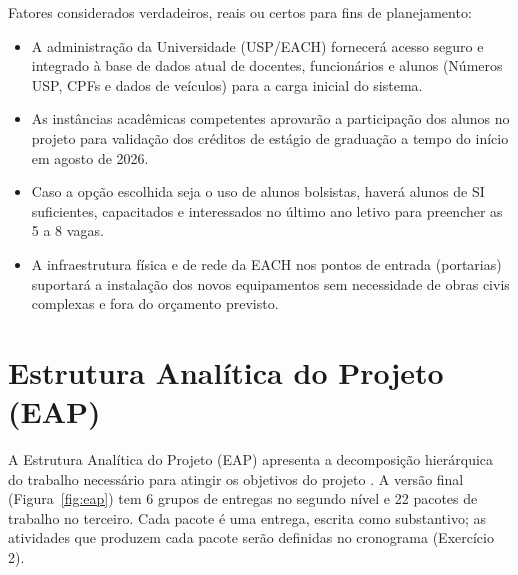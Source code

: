 \documentclass[a4paper]{article}
\begin{document}
Fatores considerados verdadeiros, reais ou certos para fins de planejamento:

\begin{itemize}
    \item A administração da Universidade (USP/EACH) fornecerá acesso seguro e integrado à base de dados atual de docentes, funcionários e alunos (Números USP, CPFs e dados de veículos) para a carga inicial do sistema.
    \item As instâncias acadêmicas competentes aprovarão a participação dos alunos no projeto para validação dos créditos de estágio de graduação a tempo do início em agosto de 2026.
    \item Caso a opção escolhida seja o uso de alunos bolsistas, haverá alunos de SI suficientes, capacitados e interessados no último ano letivo para preencher as 5 a 8 vagas.
    \item A infraestrutura física e de rede da EACH nos pontos de entrada (portarias) suportará a instalação dos novos equipamentos sem necessidade de obras civis complexas e fora do orçamento previsto.
\end{itemize}

\section{Estrutura Analítica do Projeto (EAP)}

A Estrutura Analítica do Projeto (EAP) apresenta a decomposição hierárquica do trabalho necessário para atingir os objetivos do projeto \cite{pmi2017}. A versão final (Figura~\ref{fig:eap}) tem 6 grupos de entregas no segundo nível e 22 pacotes de trabalho no terceiro. Cada pacote é uma entrega, escrita como substantivo; as atividades que produzem cada pacote serão definidas no cronograma (Exercício 2).
\end{document}
